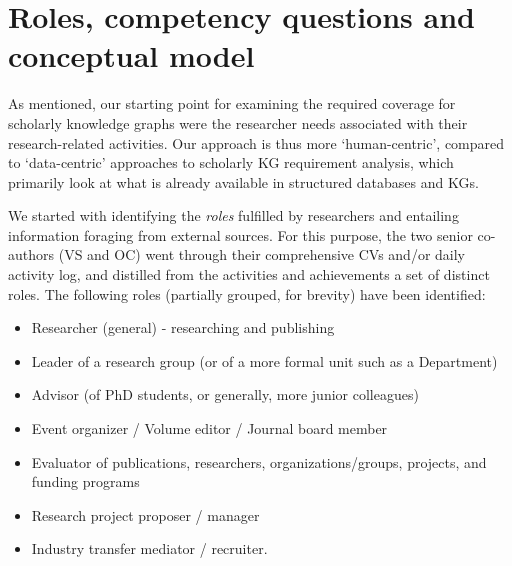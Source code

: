 \section{
Roles, competency questions and conceptual model}

\label{section:3}

As mentioned, our starting point for examining the required coverage for scholarly knowledge graphs were the researcher needs associated with their research-related activities.
Our approach is thus more `human-centric', compared to `data-centric' approaches to scholarly KG requirement analysis, which primarily look at what is already available in structured databases and KGs.

We started with identifying the \emph{roles} fulfilled by researchers and entailing information foraging from external sources. 
For this purpose, the two senior co-authors (VS and OC) went through their comprehensive CVs and/or daily activity log, and distilled from the activities and achievements a set of distinct roles. 
The following roles (partially grouped, for brevity) have been identified:

\begin{itemize}
    \item Researcher (general) - researching and publishing
    \item Leader of a research group  (or of a more formal unit such as a Department)
    \item Advisor (of PhD students, or generally, more junior colleagues)
    \item Event organizer / Volume editor / Journal board member
    \item Evaluator of publications, researchers, organizations/groups, projects, and funding programs
    \item Research project proposer / manager
    \item Industry transfer mediator / recruiter.
\end{itemize}


